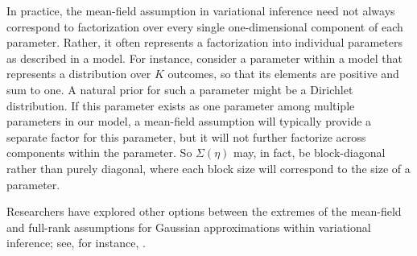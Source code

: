 In practice, the mean-field assumption in variational inference need not always
correspond to factorization over every single one-dimensional component of each
parameter. Rather, it often represents a factorization into individual
parameters as described in a model. For instance, consider a parameter within a
model that represents a distribution over $K$ outcomes, so that its elements are
positive and sum to one. A natural prior for such a parameter might be a
Dirichlet distribution. If this parameter exists as one parameter among multiple
parameters in our model, a mean-field assumption will typically provide a
separate factor for this parameter, but it will not further factorize across
components within the parameter. So $\Sigma(\eta)$ may, in fact, be
block-diagonal rather than purely diagonal, where each block size will
correspond to the size of a parameter. 

Researchers have explored other options between the extremes of the mean-field
and full-rank assumptions for Gaussian approximations within variational
inference; see, for instance, \citep{zhang:2022:pathfinder}.